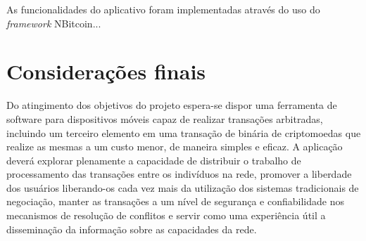\documentclass[
	article,			%
	11pt,				%
	oneside,			%
	a4paper,			%
	chapter=TITLE,		%
	section=TITLE,		%
	subsection=TITLE,	%
	subsubsection=TITLE, %
	english,			%
	brazil,				%
	sumario=tradicional
	]{ifrs-artigo-abntex2}
\begin{document}

As funcionalidades do aplicativo foram implementadas através do uso do \textit{framework} NBitcoin...



% 

\section{Considerações finais}
Do atingimento dos objetivos do projeto espera-se dispor uma ferramenta de software para dispositivos móveis capaz de realizar transações arbitradas, incluindo um terceiro elemento em uma transação de binária de criptomoedas que realize as mesmas a um custo menor, de maneira simples e eficaz. A aplicação deverá explorar plenamente a capacidade de distribuir o trabalho de processamento das transações entre os indivíduos na rede, promover a liberdade dos usuários liberando-os cada vez mais da utilização dos sistemas tradicionais de negociação, manter as transações  a um nível de segurança e confiabilidade nos mecanismos de resolução de conflitos e servir como uma experiência útil a disseminação da informação sobre as capacidades da rede.

\postextual


%
%

\end{document}
